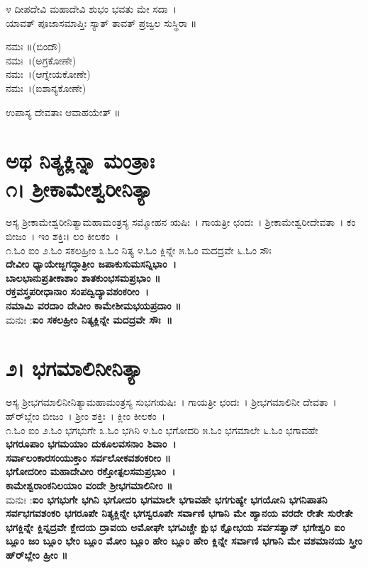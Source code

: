 ೪ ದೀಪದೇವಿ ಮಹಾದೇವಿ ಶುಭಂ ಭವತು ಮೇ ಸದಾ~।\\
ಯಾವತ್ ಪೂಜಾಸಮಾಪ್ತಿಃ ಸ್ಯಾತ್ ತಾವತ್ ಪ್ರಜ್ವಲ ಸುಸ್ಥಿರಾ ॥

 ನಮಃ ॥(ಬಿಂದೌ)\\
 ನಮಃ~।(ಅಗ್ರಕೋಣೇ)\\
 ನಮಃ~।(ಆಗ್ನೇಯಕೋಣೇ)\\
 ನಮಃ~।(ಐಶಾನ್ಯಕೋಣೇ)

ಉಪಾಸ್ಯ ದೇವತಾಃ ಆವಾಹಯೇತ್ ॥
\section{ಅಥ ನಿತ್ಯಕ್ಲಿನ್ನಾ ಮಂತ್ರಾಃ\\೧। ಶ್ರೀಕಾಮೇಶ್ವರೀನಿತ್ಯಾ}
ಅಸ್ಯ ಶ್ರೀಕಾಮೇಶ್ವರೀನಿತ್ಯಾಮಹಾಮಂತ್ರಸ್ಯ ಸಮ್ಮೋಹನ ಋಷಿಃ~। ಗಾಯತ್ರೀ ಛಂದಃ~। ಶ್ರೀಕಾಮೇಶ್ವರೀದೇವತಾ~। ಕಂ ಬೀಜಂ~। ಇಂ ಶಕ್ತಿಃ। ಲಂ ಕೀಲಕಂ~।\\
೧.ಓಂ ಐಂ ೨.ಓಂ ಸಕಲಹ್ರೀಂ ೩.ಓಂ ನಿತ್ಯ  ೪.ಓಂ ಕ್ಲಿನ್ನೇ ೫.ಓಂ ಮದದ್ರವೇ ೬.ಓಂ ಸೌಃ \\
{\bfseries ದೇವೀಂ ಧ್ಯಾಯೇಜ್ಜಗದ್ಧಾತ್ರೀಂ ಜಪಾಕುಸುಮಸನ್ನಿಭಾಂ~।\\
ಬಾಲಭಾನುಪ್ರತೀಕಾಶಾಂ ಶಾತಕುಂಭಸಮಪ್ರಭಾಂ ॥\\
ರಕ್ತವಸ್ತ್ರಪರೀಧಾನಾಂ ಸಂಪದ್ವಿದ್ಯಾವಶಂಕರೀಂ~।\\
ನಮಾಮಿ ವರದಾಂ ದೇವೀಂ ಕಾಮೇಶೀಮಭಯಪ್ರದಾಂ ॥\\}
ಮನುಃ :{\bfseries  ಐಂ ಸಕಲಹ್ರೀಂ ನಿತ್ಯಕ್ಲಿನ್ನೇ ಮದದ್ರವೇ ಸೌಃ~॥}
\section{೨। ಭಗಮಾಲಿನೀನಿತ್ಯಾ}
ಅಸ್ಯ ಶ್ರೀಭಗಮಾಲಿನೀನಿತ್ಯಾಮಹಾಮಂತ್ರಸ್ಯ ಸುಭಗಋಷಿಃ~। ಗಾಯತ್ರೀ ಛಂದಃ~। ಶ್ರೀಭಗಮಾಲಿನೀ ದೇವತಾ~। ಹ್‌ರ್‌ಬ್ಲೇಂ ಬೀಜಂ~।  ಶ್ರೀಂ ಶಕ್ತಿಃ~। ಕ್ಲೀಂ ಕೀಲಕಂ~।\\
೧.ಓಂ ಐಂ  ೨.ಓಂ ಭಗಭುಗೇ ೩.ಓಂ ಭಗಿನಿ  ೪.ಓಂ ಭಗೋದರಿ  ೫.ಓಂ ಭಗಮಾಲೇ ೬.ಓಂ ಭಗಾವಹೇ\\
{\bfseries ಭಗರೂಪಾಂ ಭಗಮಯಾಂ ದುಕೂಲವಸನಾಂ ಶಿವಾಂ~।\\
ಸರ್ವಾಲಂಕಾರಸಂಯುಕ್ತಾಂ ಸರ್ವಲೋಕವಶಂಕರೀಂ ॥\\
ಭಗೋದರೀಂ ಮಹಾದೇವೀಂ ರಕ್ತೋತ್ಪಲಸಮಪ್ರಭಾಂ~।\\
ಕಾಮೇಶ್ವರಾಂಕನಿಲಯಾಂ ವಂದೇ ಶ್ರೀಭಗಮಾಲಿನೀಂ ॥\\}
ಮನುಃ :{\bfseries  ಐಂ ಭಗಭುಗೇ ಭಗಿನಿ ಭಗೋದರಿ ಭಗಮಾಲೇ ಭಗಾವಹೇ ಭಗಗುಹ್ಯೇ ಭಗಯೋನಿ ಭಗನಿಪಾತನಿ ಸರ್ವಭಗವಶಂಕರಿ ಭಗರೂಪೇ ನಿತ್ಯಕ್ಲಿನ್ನೇ ಭಗಸ್ವರೂಪೇ ಸರ್ವಾಣಿ ಭಗಾನಿ ಮೇ ಹ್ಯಾನಯ ವರದೇ ರೇತೇ ಸುರೇತೇ ಭಗಕ್ಲಿನ್ನೇ ಕ್ಲಿನ್ನದ್ರವೇ ಕ್ಲೇದಯ ದ್ರಾವಯ ಅಮೋಘೇ ಭಗವಿಚ್ಚೇ ಕ್ಷುಭ ಕ್ಷೋಭಯ ಸರ್ವಸತ್ವಾನ್ ಭಗೇಶ್ವರಿ ಐಂ ಬ್ಲೂಂ ಜಂ ಬ್ಲೂಂ ಭೇಂ ಬ್ಲೂಂ ಮೋಂ ಬ್ಲೂಂ ಹೇಂ ಬ್ಲೂಂ ಹೇಂ ಕ್ಲಿನ್ನೇ ಸರ್ವಾಣಿ ಭಗಾನಿ ಮೇ ವಶಮಾನಯ ಸ್ತ್ರೀಂ ಹ್‌ರ್‌ಬ್ಲೇಂ ಹ್ರೀಂ ॥}
